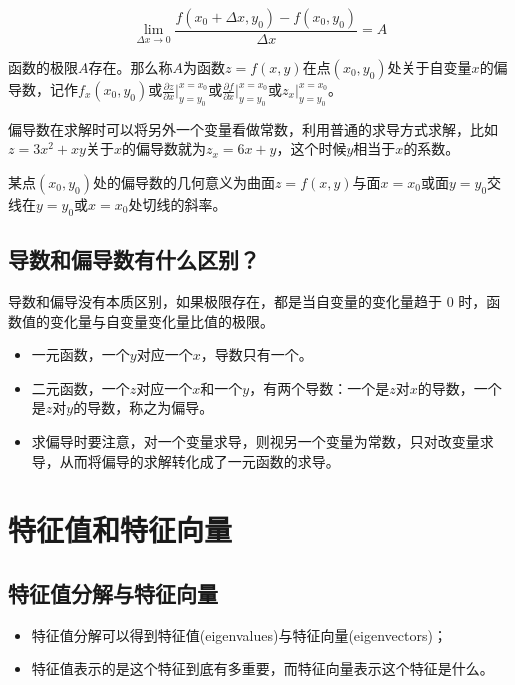 \begin{itemize}
		$$
		\lim_{\Delta x \to 0}{\frac{f(x_0+\Delta x,y_0)-f(x_0,y_0)}{\Delta x}}=A
		$$

		函数的极限$A$存在。那么称$A$为函数$z=f(x,y)$在点$(x_0,y_0)$处关于自变量$x$的偏导数，记作$f_x(x_0,y_0)$或$\frac{\partial z}{\partial x}\vert_{y=y_0}^{x=x_0}$或$\frac{\partial f}{\partial x}\vert_{y=y_0}^{x=x_0}$或$z_x\vert_{y=y_0}^{x=x_0}$。

		偏导数在求解时可以将另外一个变量看做常数，利用普通的求导方式求解，比如$z=3x^2+xy$关于$x$的偏导数就为$z_x=6x+y$，这个时候$y$相当于$x$的系数。

		某点$(x_0,y_0)$处的偏导数的几何意义为曲面$z=f(x,y)$与面$x=x_0$或面$y=y_0$交线在$y=y_0$或$x=x_0$处切线的斜率。  
\end{itemize}

\subsection{导数和偏导数有什么区别？}

导数和偏导没有本质区别，如果极限存在，都是当自变量的变化量趋于 0 时，函数值的变化量与自变量变化量比值的极限。  

\begin{itemize}\itemsep0em
		\item 一元函数，一个$y$对应一个$x$，导数只有一个。  
		\item 二元函数，一个$z$对应一个$x$和一个$y$，有两个导数：一个是$z$对$x$的导数，一个是$z$对$y$的导数，称之为偏导。  
		\item 求偏导时要注意，对一个变量求导，则视另一个变量为常数，只对改变量求导，从而将偏导的求解转化成了一元函数的求导。
\end{itemize}


\section{特征值和特征向量}

\subsection{特征值分解与特征向量}

\begin{itemize}\itemsep0em
		\item 特征值分解可以得到特征值(eigenvalues)与特征向量(eigenvectors)；
		\item 特征值表示的是这个特征到底有多重要，而特征向量表示这个特征是什么。  
\end{itemize}

